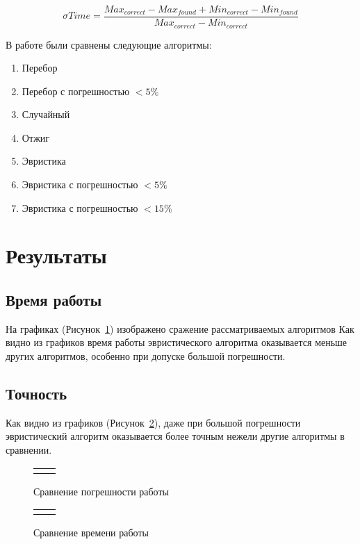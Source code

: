 \documentclass[pscyr,specification,annotation]{itmo-student-thesis}
\begin{document}
\[
    \sigma Time = \frac{Max_{correct} - Max_{found} + Min_{correct} - Min_{found}}
    {Max_{correct} - Min_{correct}}
\]

В работе были сравнены следующие алгоритмы: 

\begin{enumerate}
        \item Перебор
        \item Перебор с погрешностью $<5\%$
        \item Случайный
        \item Отжиг
        \item Эвристика
        \item Эвристика с погрешностью $<5\%$
        \item Эвристика с погрешностью $<15\%$
\end{enumerate}

\section{Результаты}
\subsection{Время работы}
    На графиках (Рисунок~\ref{time}) изображено сражение рассматриваемых алгоритмов
    Как видно из графиков время работы эвристического алгоритма 
    оказывается меньше других алгоритмов, особенно при допуске большой погрешности.

\subsection{Точность}
    Как видно из графиков (Рисунок~\ref{error}), даже при большой погрешности эвристический алгоритм
    оказывается более точным нежели другие алгоритмы в сравнении.

    \begin{center}
    \begin{figure}[h!]
    \caption{Сравнение погрешности работы}\label{time}
    \def \graphwidth{0.45\textwidth}
    \def \graphheight{0.35\textheight}
    \begin{tabular}{c c}
         &
         \\
    \end{tabular}
    \end{figure}
    \begin{figure}[h!]
    \caption{Сравнение времени работы}\label{error}
    \def \graphwidth{0.45\textwidth}
    \def \graphheight{0.35\textheight}
    \begin{tabular}{c c}
         &
         \\
    \end{tabular}
    \end{figure}
    \end{center}
\end{document}
